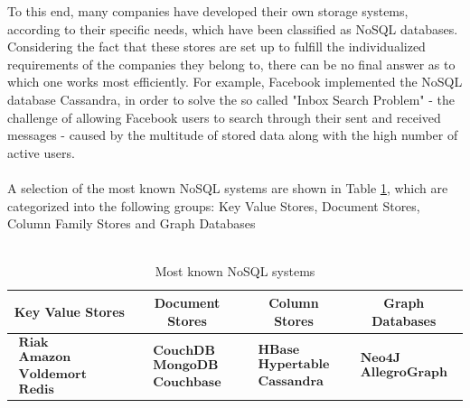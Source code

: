 To this end, many companies have developed their own storage systems, according to their specific needs, which have been classified as \ac{NoSQL} databases. Considering the fact that these stores are set up to fulfill the individualized requirements of the companies they belong to, there can be no final answer as to which one works most efficiently. For example, Facebook implemented the \ac{NoSQL} database Cassandra, in order to solve the so called "Inbox Search Problem" - the challenge of allowing Facebook users to search through their sent and received messages - caused by the multitude of stored data along with the high number of active users. 
\\
\\
A selection of the most known \ac{NoSQL} systems are shown in Table \ref{tbl:nosql_sys}, which are categorized into the following groups: Key Value Stores, Document Stores, Column Family Stores and  Graph Databases
\\
\\
\begin{table}[htb]
\begin{tabular}{|c|c|c|c|}
\hline 
\textbf{Key Value Stores} & \textbf{Document Stores} & \textbf{Column Stores} & \textbf{Graph Databases} \\ 
\hline 
$\begin{array}{l} \textbf{Riak} \\ \textbf{Amazon SimpleDB} \\ \textbf{Voldemort}\\  \textbf{Redis} \end{array}$ & 
$\begin{array}{l} \textbf{CouchDB} \\ \textbf{MongoDB} \\ \textbf{Couchbase} \end{array}$ & 
$\begin{array}{l} \textbf{HBase} \\ \textbf{Hypertable} \\ \textbf{Cassandra}  \end{array}$  & 
$\begin{array}{l} \textbf{Neo4J} \\ \textbf{AllegroGraph}   \end{array}$ \\ 
\hline 
\end{tabular}
\caption{Most known NoSQL systems}
\label{tbl:nosql_sys}
\end{table}
\\
\\

